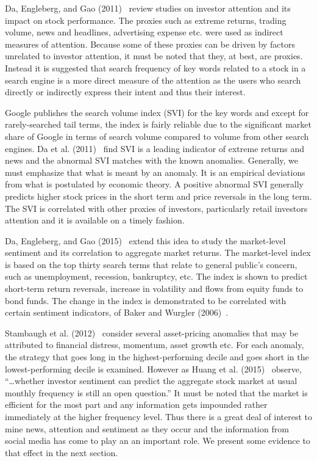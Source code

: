 Da, Engleberg, and Gao (2011)~\cite{da2011search} review studies on investor attention and its impact on stock performance. The proxies such as extreme returns, trading volume, news and headlines, advertising expense etc. were used as indirect measures of attention. Because some of these proxies can be driven by factors unrelated to investor attention, it must be noted that they, at best, are proxies. Instead it is suggested that search frequency of key words related to a stock in a search engine is a more direct measure of the attention as the users who search directly or indirectly express their intent and thus their interest.


Google publishes the search volume index (SVI) for the key words and except for rarely-searched tail terms, the index is fairly reliable due to the significant market share of Google in terms of search volume compared to volume from other search engines. Da et al. (2011)~\cite{da2011search} find SVI is a leading indicator of extreme returns and news and the abnormal SVI matches with the known anomalies. Generally, we must emphasize that what is meant by an anomaly. It is an empirical deviations from what is postulated by economic theory. A positive abnormal SVI generally predicts higher stock prices in the short term and price reversals in the long term. The SVI is correlated with other proxies of investors, particularly retail investors attention and it is available on a timely fashion. 


Da, Engleberg, and Gao (2015)~\cite{da2015sum} extend this idea to study the market-level sentiment and its correlation to aggregate market returns. The market-level index is based on the top thirty search terms that relate to general public's concern, such as unemployment, recession, bankruptcy, etc. The index is shown to predict short-term return reversals, increase in volatility and flows from equity funds to bond funds. The change in the index is demonstrated to be correlated with certain sentiment indicators, of Baker and Wurgler (2006)~\cite{baker2006investor}.


Stambaugh et al. (2012)~\cite{stamb} consider several asset-pricing anomalies that may be attributed to financial distress, momentum, asset growth etc. For each anomaly, the strategy that goes long in the highest-performing decile and goes short in the lowest-performing decile is examined. However as Huang et al. (2015)~\cite{huang} observe, ``\dots whether investor sentiment can predict the aggregate stock market at usual monthly frequency is still an open question.'' It must be noted that the market is efficient for the most part and any information gets impounded rather immediately at the higher frequency level. Thus there is a great deal of interest to mine news, attention and sentiment as they occur and the information from social media has come to play an an important role. We present some evidence to that effect in the next section. 



